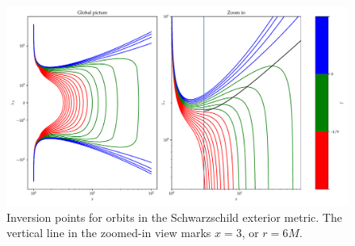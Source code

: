 \documentclass[main.tex]{subfiles}
\begin{document}
\begin{figure}[ht]
\centering
\includegraphics[width=\textwidth]{figures/schwarzschild_orbit_inversions.pdf}
\caption{Inversion points for orbits in the Schwarzschild exterior metric. The vertical line in the zoomed-in view marks \(x =3\), or \(r = 6M\).}
\label{fig:schwarzschild-inversion}
\end{figure}
\end{document}
